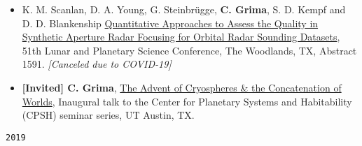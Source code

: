 \begin{itemize}
\item
  K. M. Scanlan, D. A. Young, G. Steinbrügge, \textbf{C. Grima},  S.  D.  Kempf and  D. D. Blankenship \href{https://www.hou.usra.edu/meetings/lpsc2020/pdf/1591.pdf}{Quantitative Approaches to Assess the Quality in Synthetic Aperture Radar Focusing for Orbital Radar Sounding Datasets}, 51th Lunar and Planetary Science Conference, The Woodlands, TX, Abstract 1591. \emph{[Canceled due to COVID-19]}
\item
  \textbf{{[}Invited{]} C. Grima}, \href{https://}{The Advent of Cryospheres \& the Concatenation of Worlds}, Inaugural talk to the Center for Planetary Systems and Habitability (CPSH) seminar series, UT Austin, TX.
\end{itemize}

\noindent\texttt{2019}

